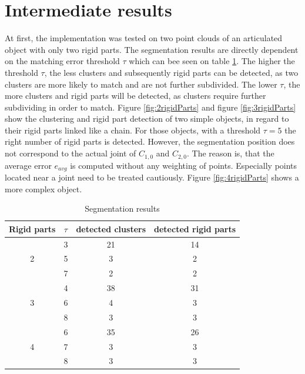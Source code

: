 \documentclass[notitlepage,english]{hgbreport}
\begin{document}
	\section{Intermediate results}
	
	At first, the implementation was tested on two point clouds of an articulated object with only two rigid parts. The segmentation results are directly dependent on the matching error threshold $\tau$ which can bee seen on table \ref{table:segmentation_results}. The higher the threshold $\tau$, the less clusters and subsequently rigid parts can be detected, as two clusters are more likely to match and are not further subdivided. The lower $\tau$, the more clusters and rigid parts will be detected, as clusters require further subdividing in order to match. Figure \ref{fig:2rigidParts} and figure \ref{fig:3rigidParts} show the clustering and rigid part detection of two simple objects, in regard to their rigid parts linked like a chain. For those objects, with a threshold $\tau = 5$ the right number of rigid parts is detected. However, the segmentation position does not correspond to the actual joint of $C_{1,0}$ and $C_{2,0}$. The reason is, that the average error $e_{avg}$ is computed without any weighting of points. Especially points located near a joint need to be treated cautiously. Figure \ref{fig:4rigidParts} shows a more complex object.
	\begin{table}
		\centering\small
		\begin{tabular}{ |c|c|c|c| } 
			\hline
			Rigid parts & $\tau$ & detected clusters & detected rigid parts \\
			\hline
			& 3 & 21 & 14 \\ 
			2& 5 & 3 & 2 \\
			& 7 & 2 & 2 \\
			\hline
			& 4 & 38 & 31 \\ 
			3 & 6 & 4 & 3 \\
			& 8 & 3 & 3 \\
			\hline
			& 6 & 35 & 26 \\ 
			4 & 7 & 3 & 3 \\
			& 8 & 3 & 3 \\
			\hline
		\end{tabular}
		\caption{Segmentation results}
		\label{table:segmentation_results}
	\end{table}
\end{document}
